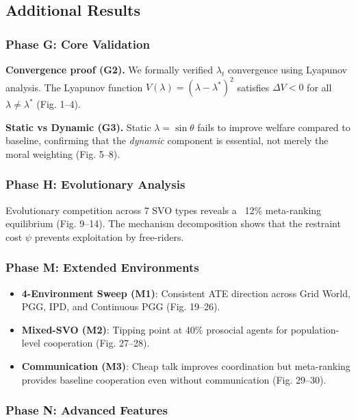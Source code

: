 \documentclass{article}
\begin{document}
\subsection{Additional Results}

\subsubsection{Phase G: Core Validation}

\noindent\textbf{Convergence proof (G2).} We formally verified $\lambda_t$ convergence using Lyapunov analysis. The Lyapunov function $V(\lambda) = (\lambda - \lambda^*)^2$ satisfies $\Delta V < 0$ for all $\lambda \neq \lambda^*$ (Fig. 1--4).

\noindent\textbf{Static vs Dynamic (G3).} Static $\lambda = \sin\theta$ fails to improve welfare compared to baseline, confirming that the \textit{dynamic} component is essential, not merely the moral weighting (Fig. 5--8).

\subsubsection{Phase H: Evolutionary Analysis}

Evolutionary competition across 7 SVO types reveals a ~12\% meta-ranking equilibrium (Fig. 9--14). The mechanism decomposition shows that the restraint cost $\psi$ prevents exploitation by free-riders.

\subsubsection{Phase M: Extended Environments}

\begin{itemize}
    \item \textbf{4-Environment Sweep (M1)}: Consistent ATE direction across Grid World, PGG, IPD, and Continuous PGG (Fig. 19--26).
    \item \textbf{Mixed-SVO (M2)}: Tipping point at 40\% prosocial agents for population-level cooperation (Fig. 27--28).
    \item \textbf{Communication (M3)}: Cheap talk improves coordination but meta-ranking provides baseline cooperation even without communication (Fig. 29--30).
\end{itemize}

\subsubsection{Phase N: Advanced Features}
\end{document}
